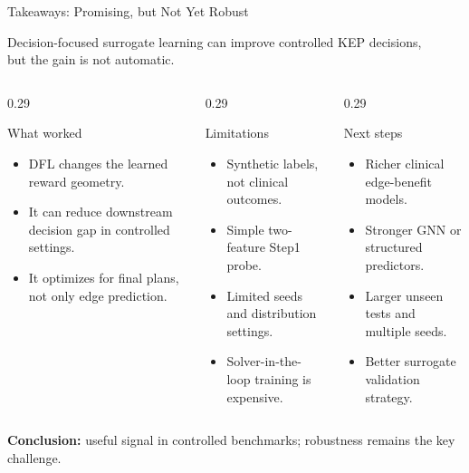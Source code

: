 \documentclass[aspectratio=169]{beamer}
\begin{document}
\begin{frame}{Takeaways: Promising, but Not Yet Robust}
  \centering
  \begin{minipage}{0.92\textwidth}
    \centering
    \large
    Decision-focused surrogate learning can improve controlled KEP decisions,\\
    but the gain is not automatic.
  \end{minipage}

  \vspace{1.0em}

  \scriptsize
  \begin{columns}[T,onlytextwidth]
    \begin{column}{0.29\textwidth}
      \begin{block}{What worked}
        \begin{itemize}\setlength{\itemsep}{0.35em}
          \item DFL changes the learned reward geometry.
          \item It can reduce downstream decision gap in controlled settings.
          \item It optimizes for final plans, not only edge prediction.
        \end{itemize}
      \end{block}
    \end{column}
    \begin{column}{0.29\textwidth}
      \begin{block}{Limitations}
        \begin{itemize}\setlength{\itemsep}{0.35em}
          \item Synthetic labels, not clinical outcomes.
          \item Simple two-feature Step1 probe.
          \item Limited seeds and distribution settings.
          \item Solver-in-the-loop training is expensive.
        \end{itemize}
      \end{block}
    \end{column}
    \begin{column}{0.29\textwidth}
      \begin{block}{Next steps}
        \begin{itemize}\setlength{\itemsep}{0.35em}
          \item Richer clinical edge-benefit models.
          \item Stronger GNN or structured predictors.
          \item Larger unseen tests and multiple seeds.
          \item Better surrogate validation strategy.
        \end{itemize}
      \end{block}
    \end{column}
  \end{columns}

  \vspace{0.8em}
  \colorbox{kepblue!8}{%
    \parbox{0.88\textwidth}{\centering\scriptsize
      \textbf{Conclusion:} useful signal in controlled benchmarks; robustness remains the key challenge.
    }%
  }
\end{frame}
\end{document}
